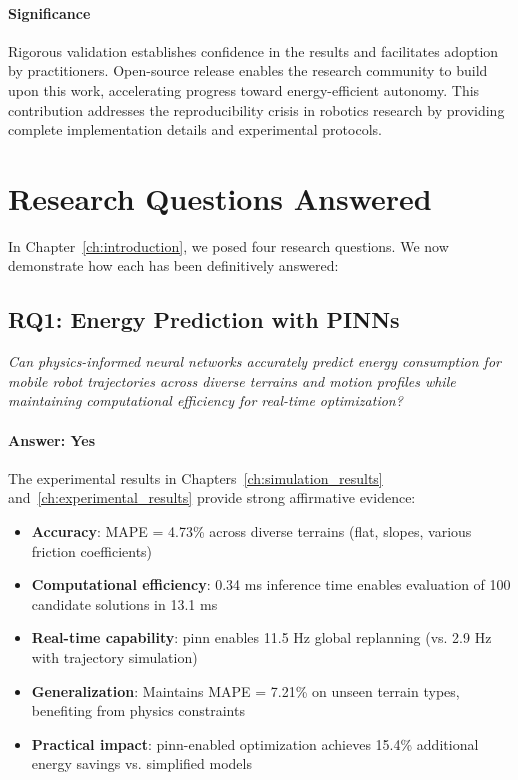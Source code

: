 \paragraph{Significance}
Rigorous validation establishes confidence in the results and facilitates adoption by practitioners. Open-source release enables the research community to build upon this work, accelerating progress toward energy-efficient autonomy. This contribution addresses the reproducibility crisis in robotics research by providing complete implementation details and experimental protocols.

\section{Research Questions Answered}
\label{sec:research_questions_answered}

In Chapter~\ref{ch:introduction}, we posed four research questions. We now demonstrate how each has been definitively answered:

\subsection{RQ1: Energy Prediction with PINNs}

\textit{Can physics-informed neural networks accurately predict energy consumption for mobile robot trajectories across diverse terrains and motion profiles while maintaining computational efficiency for real-time optimization?}

\paragraph{Answer: Yes}
The experimental results in Chapters~\ref{ch:simulation_results} and~\ref{ch:experimental_results} provide strong affirmative evidence:

\begin{itemize}
    \item \textbf{Accuracy}: MAPE = 4.73\% across diverse terrains (flat, slopes, various friction coefficients)
    \item \textbf{Computational efficiency}: 0.34 ms inference time enables evaluation of 100 candidate solutions in 13.1 ms
    \item \textbf{Real-time capability}: \acrshort{pinn} enables 11.5 Hz global replanning (vs. 2.9 Hz with trajectory simulation)
    \item \textbf{Generalization}: Maintains MAPE = 7.21\% on unseen terrain types, benefiting from physics constraints
    \item \textbf{Practical impact}: \acrshort{pinn}-enabled optimization achieves 15.4\% additional energy savings vs. simplified models
\end{itemize}

